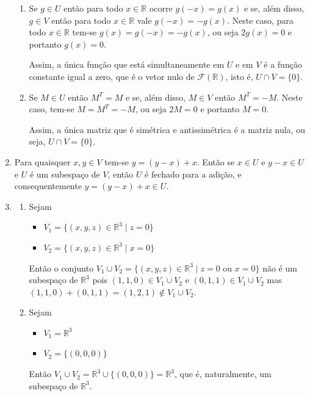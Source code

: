 \documentclass[12pt,a4paper]{article}
\newcommand*\R{\mathbb{R}}
\begin{document}
\begin{enumerate}
\begin{enumerate}
\item Se $g \in U$ então para todo $x \in \R$ ocorre $g(-x) = g(x)$ e se, além disso, $g \in V$ então para todo $x \in \R$ vale $g(-x) = -g(x)$. Neste caso, para todo $x \in \R$ tem-se $g(x) = g(-x) = -g(x)$, ou seja $2g(x) = 0$ e portanto $g(x) = 0$.

Assim, a única função que está simultaneamente em $U$ e em $V$ é a função constante igual a zero, que é o vetor nulo de $\mathcal{F}(\R)$, isto é, $U \cap V = \{ 0 \}$.

\item Se $M \in U$ então $M^T = M$ e se, além disso, $M \in V$ então $M^T = -M$. Neste caso, tem-se $M = M^T = -M$, ou seja $2M = 0$ e portanto $M = 0$.

Assim, a única matriz que é simétrica e antissimétrica é a matriz nula, ou seja, $U \cap V = \{ 0 \}$.
\end{enumerate}


\item Para quaisquer $x, y \in V$ tem-se $y = (y - x) + x$. Então se $x \in U$ e $y-x \in U$ e $U$ é um subespaço de $V$, então $U$ é fechado para a adição, e consequentemente $y = (y - x) + x \in U$.

\item
\begin{enumerate}
\item Sejam
\begin{itemize}
\item $V_1 = \{ (x,y,z) \in \R^3 \mid z=0 \}$
\item $V_2 = \{ (x,y,z) \in \R^3 \mid x=0 \}$
\end{itemize}
Então o conjunto $V_1 \cup V_2 = \{ (x,y,z) \in \R^3 \mid z=0 \text{ ou } x=0 \}$ não é um subespaço de $\R^3$ pois $(1,1,0) \in V_1 \cup V_2$ e $(0,1,1) \in V_1 \cup V_2$ mas $(1,1,0) + (0,1,1) = (1,2,1) \not \in V_1 \cup V_2$.

\item Sejam
\begin{itemize}
\item $V_1 = \R^3$
\item $V_2 = \{ (0,0,0) \}$
\end{itemize}
Então $V_1 \cup V_2 = \R^3 \cup \{ (0,0,0) \} = \R^3$, que é, naturalmente, um subespaço de $\R^3$.

\end{enumerate}



\end{enumerate}
\end{document}
